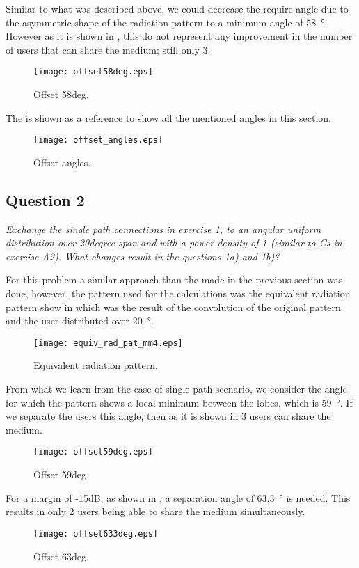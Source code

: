 Similar to what was described above, we could decrease the require angle due to the asymmetric shape of the radiation pattern to a minimum angle of \SI{58}{\degree}. However as it is shown in , this do not represent any improvement in the number of users that can share the medium; still only 3.

\begin{figure}[!h]
  \centering
  \texttt{[image: offset58deg.eps]}
  \caption{Offset 58deg.}
  \label{fig:offset58deg}
\end{figure}

The  is shown as a reference to show all the mentioned angles in this section.

\begin{figure}[!h]
  \centering
  \texttt{[image: offset\_angles.eps]}
  \caption{Offset angles.}
  \label{fig:offset_angles}
\end{figure}

\subsection{Question 2}
\textit{Exchange the single path connections in exercise 1, to an angular uniform distribution over 20degree span and with a power density of 1 (similar to Cs in exercise A2). What changes result in the questions 1a) and 1b)?}

For this problem a similar approach than the made in the previous section was done, however, the pattern used for the calculations was the equivalent radiation pattern show in  which was the result of the convolution of the original pattern and the user distributed over \SI{20}{\degree}.

\begin{figure}[!h]
  \centering
  \texttt{[image: equiv\_rad\_pat\_mm4.eps]}
  \caption{Equivalent radiation pattern.}
  \label{fig:equiv_rad_pat_mm4}
\end{figure}

From what we learn from the case of single path scenario, we consider the angle for which the pattern shows a local minimum between the lobes, which is \SI{59}{\degree}. If we separate the users this angle, then as it is shown in  3 users can share the medium.

\begin{figure}[!h]
  \centering
  \texttt{[image: offset59deg.eps]}
  \caption{Offset 59deg.}
  \label{fig:offset59deg}
\end{figure}

For a margin of -15dB, as shown in , a separation angle of \SI{63.3}{\degree} is needed. This results in only 2 users being able to share the medium simultaneously.

\begin{figure}[!h]
  \centering
  \texttt{[image: offset633deg.eps]}
  \caption{Offset 63deg.}
  \label{fig:offset633deg}
\end{figure}